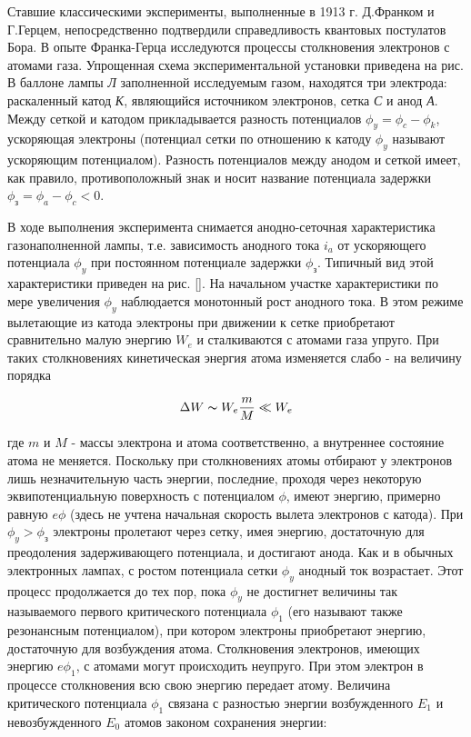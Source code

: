 Ставшие классическими эксперименты, выполненные в 1913 г. Д.Франком и Г.Герцем, непосредственно подтвердили справедливость квантовых постулатов Бора. В опыте Франка-Герца исследуются процессы столкновения электронов с атомами газа. Упрощенная схема экспериментальной установки приведена на рис. В баллоне лампы \textit{Л} заполненной исследуемым газом, находятся три электрода: раскаленный катод \textit{К}, являющийся источником электронов, сетка \textit{С} и анод \textit{А}. Между сеткой и катодом прикладывается разность потенциалов $\phi_y=\phi_c-\phi_k$, ускоряющая
электроны (потенциал сетки по отношению к катоду $\phi_y$ называют ускоряющим потенциалом). Разность потенциалов между анодом и сеткой имеет, как правило, противоположный знак и носит название потенциала задержки $\phi_\text{з}=\phi_a-\phi_c<0$.

В ходе выполнения эксперимента снимается анодно-сеточная характеристика газонаполненной лампы, т.е. зависимость анодного тока $i_a$ от ускоряющего потенциала $\phi_y$ при постоянном потенциале задержки $\phi_\text{з}$. Типичный вид этой характеристики приведен на рис. \ref{}. На начальном участке характеристики по мере увеличения $\phi_y$ наблюдается монотонный рост анодного тока. В этом режиме вылетающие из катода электроны при движении к сетке приобретают сравнительно малую энергию $W_e$ и сталкиваются с атомами газа упруго. При таких столкновениях кинетическая энергия атома изменяется слабо - на величину порядка

\begin{equation*}
	\Delta W \thicksim W_e \frac{m}{M} \ll W_e
\end{equation*}

где $m$ и $M$ - массы электрона и атома соответственно, а внутреннее состояние атома не меняется. Поскольку при столкновениях атомы отбирают у электронов лишь незначительную часть энергии, последние, проходя через некоторую эквипотенциальную поверхность с потенциалом $\phi$, имеют энергию, примерно равную $e\phi$ (здесь не учтена начальная скорость вылета электронов с катода).
При $\phi_y>\phi_\text{з}$ электроны пролетают через сетку, имея
энергию, достаточную для преодоления задерживающего потенциала, и достигают анода. Как и в обычных электронных лампах, с ростом потенциала сетки $\phi_y$ анодный ток возрастает. Этот процесс продолжается до тех пор, пока $\phi_y$ не достигнет величины так называемого первого критического потенциала $\phi_1$ (его называют также резонансным потенциалом), при котором электроны приобретают энергию, достаточную для возбуждения атома. Столкновения электронов, имеющих энергию $e\phi_1$, с атомами могут происходить неупруго. При этом электрон в процессе столкновения всю свою энергию передает атому. Величина критического потенциала $\phi_1$ связана с разностью энергии возбужденного $E_1$ и невозбужденного $E_0$ атомов законом сохранения энергии:

